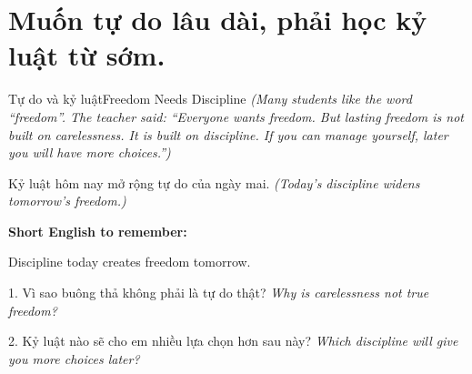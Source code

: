 \section{Muốn tự do lâu dài, phải học kỷ luật từ sớm.}
\begin{truyen}{Tự do và kỷ luật}{Freedom Needs Discipline}
\textit{(Many students like the word ``freedom''. The teacher said: ``Everyone wants freedom. But lasting freedom is not built on carelessness. It is built on discipline. If you can manage yourself, later you will have more choices.'')}
\end{truyen}

\begin{baihoc}
Kỷ luật hôm nay mở rộng tự do của ngày mai.
\textit{(Today's discipline widens tomorrow's freedom.)}
\end{baihoc}

\begin{ghinhoanh}
\textbf{Short English to remember:}

Discipline today creates freedom tomorrow.

\end{ghinhoanh}

\begin{tuhocnhanh}
1. Vì sao buông thả không phải là tự do thật? \textit{Why is carelessness not true freedom?}

2. Kỷ luật nào sẽ cho em nhiều lựa chọn hơn sau này? \textit{Which discipline will give you more choices later?}
\end{tuhocnhanh}
\ngancach